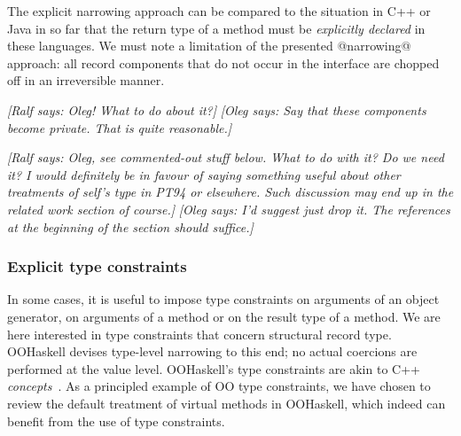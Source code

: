 \documentclass{jfp}
\newcommand{\oleg}[1]{{\it [Oleg says: #1]}}
\newcommand{\ralf}[1]{{\it [Ralf says: #1]}}
\begin{document}
The explicit narrowing approach can be compared to the situation in
C++ or Java in so far that the return type of a method must be
\emph{explicitly declared} in these languages. We must note a
limitation of the presented @narrowing@ approach: all record
components that do not occur in the interface are chopped off in an
irreversible manner.

\ralf{Oleg! What to do about it?}
\oleg{Say that these components become private. That is quite
  reasonable.}

\ralf{
Oleg, see commented-out stuff below. What to do with it?
Do we need it? I would definitely be in favour of saying something
useful about other treatments of self's type in PT94 or
elsewhere. Such discussion may end up in the related work section 
of course.}
\oleg{I'd suggest just drop it. The references at the beginning of the
section should suffice.}

\subsubsection{Explicit type constraints}

In some cases, it is useful to impose type constraints on arguments of
an object generator, on arguments of a method or on the result type of
a method. We are here interested in type constraints that concern
structural record type. OOHaskell devises type-level narrowing to
this end; no actual coercions are performed at the value
level. OOHaskell's type constraints are akin to C++
\emph{concepts}~\cite{siek05:_concepts_cpp0x}.
As a principled example of OO type constraints, we have chosen to
review the default treatment of virtual methods in OOHaskell, which
indeed can benefit from the use of type constraints.
\end{document}
